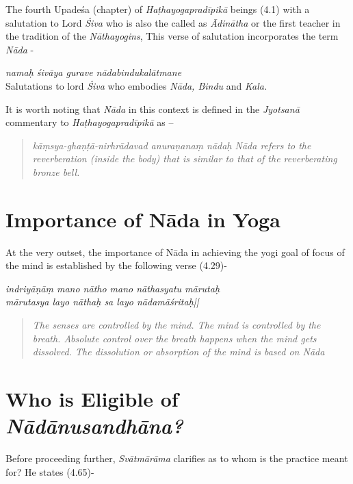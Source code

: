 The fourth Upadeśa (chapter) of \textit{Haṭhayogapradīpikā} beings (4.1) with a salutation to Lord \textit{Śiva} who is also the called as \textit{Ādinātha} or the first teacher in the tradition of the \textit{Nāthayogins}, This verse of salutation incorporates the term \textit{Nāda} - 

\begin{center}
\textit{namaḥ śivāya gurave nādabindukalātmane}\\
Salutations to lord \textit{Śiva} who embodies \textit{Nāda, Bindu} and \textit{Kala.}
\end{center}

It is worth noting that \textit{Nāda} in this context is defined in the \textit{Jyotsanā} commentary to \textit{Haṭhayogapradīpikā} as –

\begin{quote}
\begin{center}
\textit{kāṃsya-ghaṇṭā-nirhrādavad anuraṇanaṃ nādaḥ Nāda refers to the reverberation (inside the body) that is similar to that of the reverberating bronze bell.}
\end{center}
\end{quote}

\section*{Importance of Nāda in Yoga}

At the very outset, the importance of Nāda in achieving the yogi goal of focus of the mind is established by the following verse (4.29)-

\begin{shloka}
\textit{indriyāṇāṃ mano nātho mano nāthasyatu mārutaḥ}\\
\textit{mārutasya layo nāthaḥ sa layo nādamāśritaḥ||}
\end{shloka}

\begin{quote}
\textit{The senses are controlled by the mind. The mind is controlled by the breath. Absolute control over the breath happens when the mind gets dissolved. The dissolution or absorption of the mind is based on \textit{Nāda}}
\end{quote}

\section*{Who is Eligible of \textit{Nādānusandhāna?}}

Before proceeding further, \textit{Svātmārāma} clarifies as to whom is the practice meant for? He states (4.65)-


